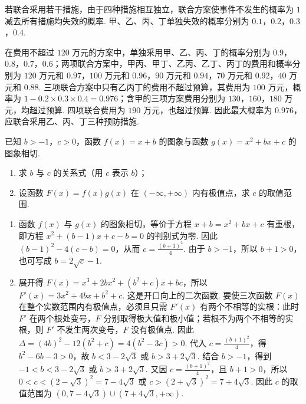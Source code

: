\begin{solution}
若联合采用若干措施，由于四种措施相互独立，联合方案使事件不发生的概率为 \(1\) 减去所有措施均失效的概率. 甲、乙、丙、丁单独失效的概率分别为 \(0.1\)，\(0.2\)，\(0.3\)，\(0.4\).

在费用不超过 \(120\) 万元的方案中，单独采用甲、乙、丙、丁的概率分别为 \(0.9\)，\(0.8\)，\(0.7\)，\(0.6\)；两项联合方案中，甲丙、甲丁、乙丙、乙丁、丙丁的费用和概率分别为 \(120\) 万元和 \(0.97\)，\(100\) 万元和 \(0.96\)，\(90\) 万元和 \(0.94\)，\(70\) 万元和 \(0.92\)，\(40\) 万元和 \(0.88\). 三项联合方案中只有乙丙丁的费用不超过预算，其费用为 \(100\) 万元，概率为 \(1-0.2\times0.3\times0.4=0.976\)；含甲的三项方案费用分别为 \(130\)，\(160\)，\(180\) 万元，均超过预算. 四项联合费用为 \(190\) 万元，也超过预算. 因此最大概率为 \(0.976\)，应联合采用乙、丙、丁三种预防措施.
\end{solution}

\begin{problem}
已知 \(b>-1\)，\(c>0\)，函数 \(f(x)=x+b\) 的图象与函数 \(g(x)=x^2+bx+c\) 的图象相切.

\begin{enumerate}
\item 求 \(b\) 与 \(c\) 的关系式（用 \(c\) 表示 \(b\)）；

\item 设函数 \(F(x)=f(x)g(x)\) 在 \(\left(-\infty,+\infty\right)\) 内有极值点，求 \(c\) 的取值范围.
\end{enumerate}
\end{problem}

\begin{solution}
\begin{enumerate}
\item 函数 \(f(x)\) 与 \(g(x)\) 的图象相切，等价于方程 \(x+b=x^2+bx+c\) 有重根，即方程 \(x^2+(b-1)x+c-b=0\) 的判别式为零. 因此 \((b-1)^2-4(c-b)=0\)，从而 \(c=\frac{(b+1)^2}{4}\). 由于 \(b>-1\)，所以 \(b+1>0\)，也可写成 \(b=2\sqrt{c}-1\).
\item 展开得 \(F(x)=x^3+2bx^2+(b^2+c)x+bc\)，所以 \(F'(x)=3x^2+4bx+b^2+c\). 这是开口向上的二次函数. 要使三次函数 \(F(x)\) 在整个实数范围内有极值点，必须且只需 \(F'(x)\) 有两个不相等的实根：此时 \(F'\) 在两个根处变号，\(F\) 分别取得极大值和极小值；若根不为两个不相等的实根，则 \(F'\) 不发生两次变号，\(F\) 没有极值点. 因此
\(\Delta=(4b)^2-12(b^2+c)=4(b^2-3c)>0\).
代入 \(c=\frac{(b+1)^2}{4}\)，得 \(b^2-6b-3>0\)，故 \(b<3-2\sqrt{3}\) 或 \(b>3+2\sqrt{3}\). 结合 \(b>-1\)，得到 \(-1<b<3-2\sqrt{3}\) 或 \(b>3+2\sqrt{3}\). 又因 \(c=\frac{(b+1)^2}{4}\)，且 \(b+1>0\)，所以
\(0<c<(2-\sqrt{3})^2=7-4\sqrt{3}\) 或 \(c>(2+\sqrt{3})^2=7+4\sqrt{3}\).
因此 \(c\) 的取值范围为 \(\left(0,7-4\sqrt{3}\right)\cup\left(7+4\sqrt{3},+\infty\right)\).
\end{enumerate}
\end{solution}
